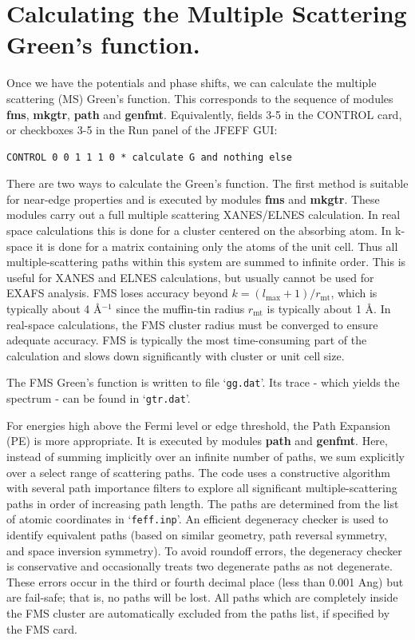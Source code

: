 \documentclass[11pt,oneside]{report} %
\renewcommand{\htmlref}[2]{\hyperlink{#2}{#1}}
\newcommand{\file}[1]{`\texttt{#1}'}
\newcommand{\module}[1]{\textrm{\bf{#1}}}
\renewcommand{\htmlref}[2]{{#1}} %
\begin{document}
\section{Calculating the Multiple Scattering Green's function.}


Once we have the potentials and phase shifts, we can calculate the multiple scattering (MS) Green's function.  This corresponds to the sequence of modules
\module{fms}, \module{mkgtr}, \module{path} and \module{genfmt}.  Equivalently, fields 3-5 in the CONTROL card, or checkboxes 3-5 in the Run panel of the JFEFF GUI:
\begin{verbatim}
CONTROL 0 0 1 1 1 0 * calculate G and nothing else
\end{verbatim}


There are two ways to calculate the Green's function.  The first method is suitable for near-edge properties and is executed by modules \module{fms} and \module{mkgtr}.
These modules carry out a full multiple scattering XANES/ELNES calculation.  
In real space calculations this is done for a cluster centered on the absorbing atom. In k-space it is done
for a matrix containing only the atoms of the unit cell.  Thus all multiple-scattering paths within this system are summed to infinite
order. This is useful for XANES and ELNES calculations, but usually cannot be
used for EXAFS analysis. FMS loses accuracy beyond $k =
(l_{\mathrm{max}}+1)/r_{\mathrm{mt}}$, which is typically about 4
\AA$^{-1}$ since the muffin-tin radius $r_{\mathrm{mt}}$ is
typically about 1 \AA.  In real-space calculations, the FMS cluster radius must be converged to ensure adequate accuracy.
FMS is typically the most time-consuming part of the calculation and slows down significantly with cluster or unit cell size.

The FMS Green's function is written to file \file{gg.dat}.  Its trace - which yields the spectrum - can be found in \file{gtr.dat}.

For energies high above the Fermi level or edge threshold, the Path Expansion (PE) is more appropriate.  It is executed by modules \module{path} and \module{genfmt}.  Here, instead of summing implicitly over an infinite number of paths, we sum explicitly over a select range of scattering paths.  The code uses a constructive algorithm with several path importance
filters to explore all significant multiple-scattering paths in order
of increasing path length. The paths are determined from the list of
atomic coordinates in \file{feff.inp}. An efficient degeneracy
checker is used to identify equivalent paths (based on similar
geometry, path reversal symmetry, and space inversion symmetry). To
avoid roundoff errors, the degeneracy checker is conservative and
occasionally treats two degenerate paths as not degenerate.
These errors occur in the third or fourth decimal place (less than
0.001 Ang) but are fail-safe; that is, no paths will be lost. All 
paths which are completely inside the FMS cluster are automatically 
excluded from the paths list, if specified by the \htmlref{FMS}{card:fms} 
card.
\end{document}
